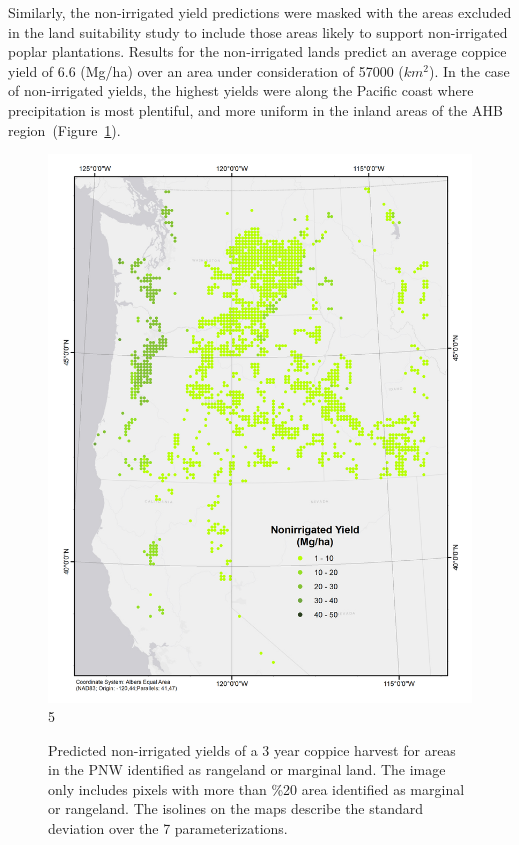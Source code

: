 \documentclass[preprint,12pt]{elsarticle}
\begin{document}
Similarly, the non-irrigated yield predictions were masked with the
areas excluded in the land suitability study to include those areas
likely to support non-irrigated poplar plantations.  Results for the
non-irrigated lands predict an average coppice yield of 6.6 (Mg/ha)
over an area under consideration of 57000 ($km^2$).  In the case of
non-irrigated yields, the highest yields were along the Pacific coast
where precipitation is most plentiful, and more uniform in the inland
areas of the \ac{AHB} region~(Figure~\ref{fig:nonirrigated_yield}).

\begin{figure}[hp]
  \centering
  \includegraphics[width=1.0\linewidth]{nonirrigated_yield}
5   \caption{Predicted non-irrigated yields of a 3 year coppice harvest for areas in the \ac{PNW} identified as rangeland or marginal land.  The image only includes pixels with more than \%20 area identified as marginal or rangeland.  The isolines on the maps describe the standard deviation over the 7 parameterizations.}
  \label{fig:nonirrigated_yield}
\end{figure}
\end{document}
